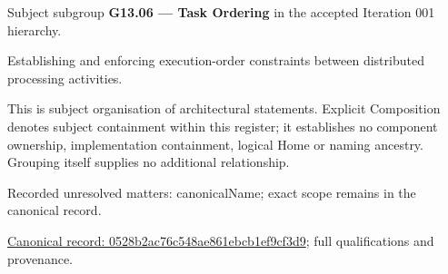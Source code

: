 Subject subgroup \textbf{G13.06 — Task Ordering} in the accepted Iteration 001 hierarchy.



Establishing and enforcing execution-order constraints between distributed processing activities.



This is subject organisation of architectural statements. Explicit Composition denotes subject containment within this register; it establishes no component ownership, implementation containment, logical Home or naming ancestry. Grouping itself supplies no additional relationship.


{\small Recorded unresolved matters: canonicalName; exact scope remains in the canonical record.}\par
{\footnotesize \href{../../../../continuum/grouping/0528b2ac76c548ae861ebcb1ef9cf3d9.md}{Canonical record: 0528b2ac76c548ae861ebcb1ef9cf3d9}; full qualifications and provenance.}\par
